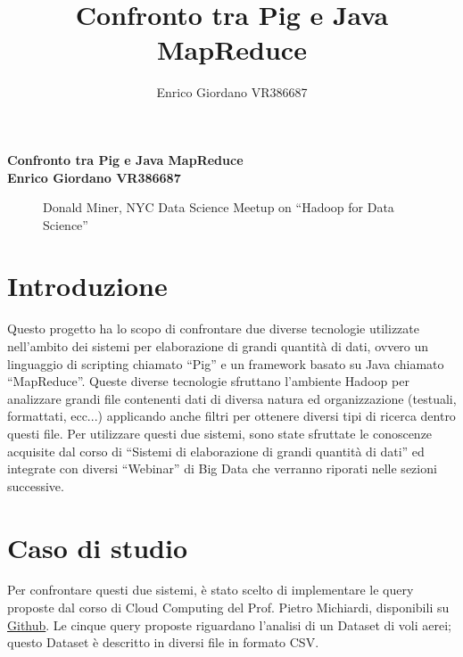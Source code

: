 \documentclass[11pt]{article} %
\title{Confronto tra Pig e Java MapReduce}
\author{Enrico Giordano VR386687}
\begin{document}
\begin{titlepage}
    \centering
    \vfill
    {\bfseries\Large
        Confronto tra Pig e Java MapReduce\\
        \vskip2cm
        Enrico Giordano VR386687\\
    }    
    \vfill
    \begin{figure}[htbp]
    \centering
    	\caption{Donald Miner, NYC Data Science Meetup on “Hadoop for Data Science”}
    \end{figure}
     \vfill
    \vfill
\end{titlepage}

\newpage 

\section{Introduzione}

Questo progetto ha lo scopo di confrontare due diverse tecnologie utilizzate nell'ambito dei sistemi per elaborazione di grandi quantità di dati, ovvero un linguaggio di scripting chiamato ``Pig'' e un framework basato su Java chiamato ``MapReduce''. Queste diverse tecnologie sfruttano l'ambiente Hadoop per analizzare grandi file contenenti dati di diversa natura ed organizzazione (testuali, formattati, ecc...) applicando anche filtri per ottenere diversi tipi di ricerca dentro questi file. Per utilizzare questi due sistemi, sono state sfruttate le conoscenze acquisite dal corso di ``Sistemi di elaborazione di grandi quantità di dati'' ed integrate con diversi ``Webinar'' di Big Data che verranno riporati nelle sezioni successive.  

\section{Caso di studio}
Per confrontare questi due sistemi, è stato scelto di implementare le query proposte dal corso di Cloud Computing del Prof. Pietro Michiardi, disponibili su \href{https://github.com/michiard/CLOUDS-LAB/tree/master/labs/pig-lab/airtraffic-analysis}{Github}. Le cinque query proposte riguardano l'analisi di un Dataset di voli aerei; questo Dataset è descritto in diversi file in formato CSV. 
\end{document}
